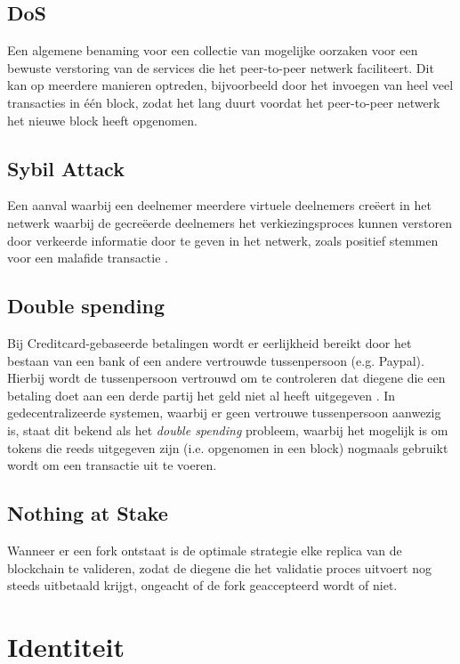 \subsection{\acrfull{DoS}}
Een algemene benaming voor een collectie van mogelijke oorzaken voor een bewuste verstoring van de services die het peer-to-peer netwerk faciliteert. Dit kan op meerdere manieren optreden, bijvoorbeeld door het invoegen van heel veel transacties in één block, zodat het lang duurt voordat het peer-to-peer netwerk het nieuwe block heeft opgenomen.

\subsection{Sybil Attack}
Een aanval waarbij een deelnemer meerdere virtuele deelnemers creëert in het netwerk waarbij de gecreëerde deelnemers het verkiezingsproces kunnen verstoren door verkeerde informatie door te geven in het netwerk, zoals positief stemmen voor een malafide transactie \citep{conti2017survey}.

\subsection{Double spending}
Bij Creditcard-gebaseerde betalingen wordt er eerlijkheid bereikt door het bestaan van een bank of een andere vertrouwde tussenpersoon (e.g. Paypal). Hierbij wordt de tussenpersoon vertrouwd om te controleren dat diegene die een betaling doet aan een derde partij het geld niet al heeft uitgegeven \citep{karame2012two}. In gedecentralizeerde systemen, waarbij er geen vertrouwe tussenpersoon aanwezig is, staat dit bekend als het \textit{double spending} probleem, waarbij het mogelijk is om \glspl{token} die reeds uitgegeven zijn (i.e. opgenomen in een block) nogmaals gebruikt wordt om een transactie uit te voeren. 

\subsection{Nothing at Stake}
Wanneer er een \gls{fork} ontstaat is de optimale strategie elke replica van de blockchain te valideren, zodat de diegene die het validatie proces uitvoert nog steeds uitbetaald krijgt, ongeacht of de \gls{fork} geaccepteerd wordt of niet.

\newpage

\section{Identiteit}

